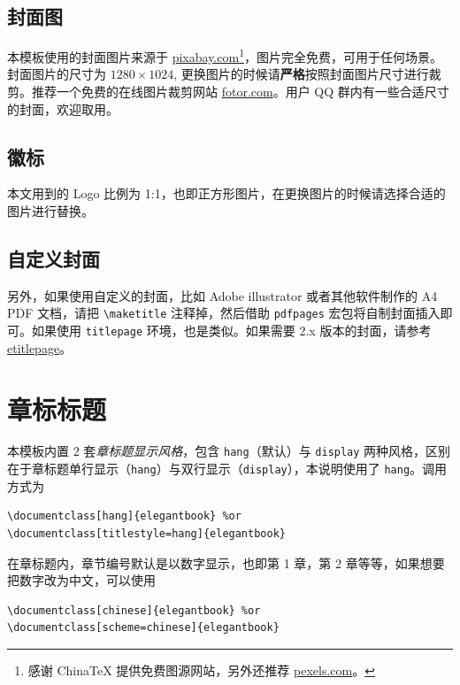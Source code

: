 \documentclass[lang=cn,10pt]{elegantbook}
\begin{document}
\subsection{封面图}

本模板使用的封面图片来源于 \href{https://pixabay.com/en/tea-time-poetry-coffee-reading-3240766/}{pixabay.com}\footnote{感谢 China\TeX{} 提供免费图源网站，另外还推荐 \href{https://www.pexels.com/}{pexels.com}。}，图片完全免费，可用于任何场景。封面图片的尺寸为 $1280 \times 1024$, 更换图片的时候请\textbf{严格}按照封面图片尺寸进行裁剪。推荐一个免费的在线图片裁剪网站 \href{https://www.fotor.com/cn}{fotor.com}。用户 QQ 群内有一些合适尺寸的封面，欢迎取用。

\subsection{徽标}

本文用到的 Logo 比例为 1:1，也即正方形图片，在更换图片的时候请选择合适的图片进行替换。

\subsection{自定义封面}

另外，如果使用自定义的封面，比如 Adobe illustrator 或者其他软件制作的 A4 PDF 文档，请把 \lstinline{\maketitle} 注释掉，然后借助 \lstinline{pdfpages} 宏包将自制封面插入即可。如果使用 \lstinline{titlepage} 环境，也是类似。如果需要 2.x 版本的封面，请参考 \href{https://github.com/EthanDeng/etitlepage}{etitlepage}。

\section{章标标题}

本模板内置 2 套\textit{章标题显示风格}，包含 \lstinline{hang}（默认）与 \lstinline{display} 两种风格，区别在于章标题单行显示（\lstinline{hang}）与双行显示（\lstinline{display}），本说明使用了 \lstinline{hang}。调用方式为
\begin{lstlisting}
\documentclass[hang]{elegantbook} %or
\documentclass[titlestyle=hang]{elegantbook}
\end{lstlisting}

在章标题内，章节编号默认是以数字显示，也即{\kaishu 第 1 章}，{\kaishu 第 2 章}等等，如果想要把数字改为中文，可以使用
\begin{lstlisting}
\documentclass[chinese]{elegantbook} %or
\documentclass[scheme=chinese]{elegantbook}
\end{lstlisting}
\end{document}

